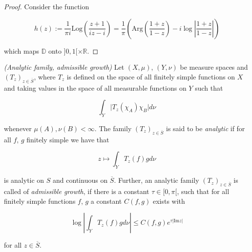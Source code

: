 \begin{proof}
	Consider the function 

	\begin{equation}
		h(z) := \frac{1}{\pi i}\mathrm{Log}\left( \frac{z + 1}{iz - i} \right) = \frac{1}{\pi} \left( \mathrm{Arg} \left( \frac{1 + z}{1 - z} \right)-i\log\left\vert \frac{1 + z}{1 - z} \right\vert\right)
	\end{equation}

which maps $\mathbb{D}$ onto $]0,1[ \times \mathbb{R}$.
\end{proof}

\vspace{2mm}

\begin{mdframed}
	\begin{definition}\emph{(Analytic family, admissible growth)}
		Let $(X,\mu)$, $(Y,\nu)$ be measure spaces and $\left( T_z \right)_{z \in \overline{S}}$, where $T_z$ is defined on the space of all finitely simple functions on $X$ and taking values in the space of all measurable functions on $Y$ such that

		\begin{equation}
			\int_Y \vert T_z(\chi_A)\chi_B \vert d\nu
		\end{equation}

		whenever $\mu(A),\nu(B) < \infty$. The family $\left( T_z \right)_{z \in \overline{S}}$ is said to be \emph{analytic} if for all $f$, $g$ finitely simple we have that

		\begin{equation}
			z \mapsto \int_Y T_z(f)gd\nu
		\end{equation}

		is analytic on $S$ and continuous on $\overline{S}$. Further, an analytic family $\left( T_z \right)_{z \in \overline{S}}$ is called of \emph{admissible growth}, if there is a constant $\tau \in [0,\pi[$, such that for all finitely simple functions $f$, $g$ a constant $C(f,g)$ exists with

			\begin{equation}
				\log\left\vert \int_Y T_z(f) g d\nu\right\vert \leqslant C(f,g)e^{\tau\vert \mathrm{Im}z\vert}
			\end{equation}

			for all $z \in \overline{S}$.
	\end{definition}
\end{mdframed}

\vspace{2mm}

